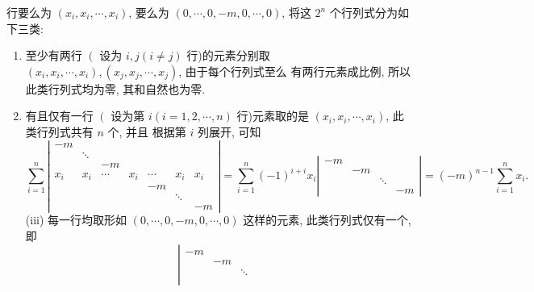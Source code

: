 \documentclass{article}
\begin{document}
行要么为 $\left(x_{i}, x_{i}, \cdots, x_{i}\right)$, 要么为 $(0, \cdots, 0,-m, 0, \cdots, 0)$, 将这 $2^{n}$ 个行列式分为如下三类:
\begin{enumerate}[\qquad (i) ]
    \item 至少有两行 $\left(\right.$ 设为 $i, j(i \neq j)$ 行)的元素分别取 $\left(x_{i}, x_{i}, \cdots, x_{i}\right),\left(x_{j}, x_{j}, \cdots, x_{j}\right)$, 由于每个行列式至么 有两行元素成比例, 所以此类行列式均为零, 其和自然也为零.
    \item 有且仅有一行 $\left(\right.$ 设为第 $i(i=1,2, \cdots, n)$ 行)元素取的是 $\left(x_{i}, x_{i}, \cdots, x_{i}\right)$, 此类行列式共有 $n$ 个, 并且 根据第 $i$ 列展开, 可知
          $$
              \sum_{i = 1}^{n}\left|\begin{array}{llllllll}
                  -m    &        &        &       &        &        &       \\
                        & \ddots &        &       &        &        &       \\
                        &        & -m     &       &        &        &       \\
                  x_{i} & x_{i}  & \cdots & x_{i} & \cdots & x_{i}  & x_{i} \\
                        &        &        &       & -m     &        &       \\
                        &        &        &       &        & \ddots &       \\
                        &        &        &       &        &        & -m
              \end{array}\right|=\sum_{i=1}^{n}(-1)^{i+i} x_{i}
              \left|\begin{array}{cccc}
                  -m &    &        &    \\
                     & -m &        &    \\
                     &    & \ddots &    \\
                     &    &        & -m
              \end{array} \right| =(-m)^{n-1} \sum_{i=1}^{n} x_{i} .
          $$
          (iii) 每一行均取形如 $(0, \cdots, 0,-m, 0, \cdots, 0)$ 这样的元素, 此类行列式仅有一个, 即
          $$
              \left|\begin{array}{llll}
                  -m &    &        &    \\
                     & -m &        &    \\
                     &    & \ddots &    \\

\end{array}$$
\end{enumerate}
\end{document}
